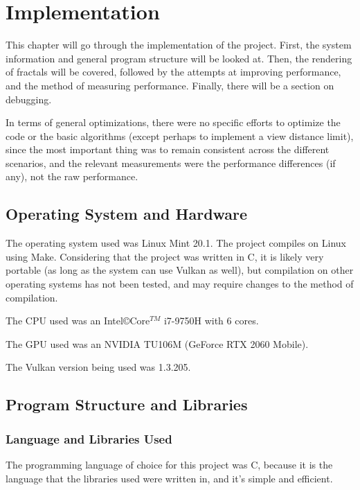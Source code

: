 \chapter{Implementation}
\label{chapter3}

This chapter will go through the implementation of the project. First, the system information and general program structure will be looked at. Then, the rendering of fractals will be covered, followed by the attempts at improving performance, and the method of measuring performance. Finally, there will be a section on debugging.\newline

In terms of general optimizations, there were no specific efforts to optimize the code or the basic algorithms (except perhaps to implement a view distance limit), since the most important thing was to remain consistent across the different scenarios, and the relevant measurements were the performance differences (if any), not the raw performance.

\section{Operating System and Hardware}

The operating system used was Linux Mint 20.1. The project compiles on Linux using Make. Considering that the project was written in C, it is likely very portable (as long as the system can use Vulkan as well), but compilation on other operating systems has not been tested, and may require changes to the method of compilation.\newline

The CPU used was an Intel\copyright Core$^{TM}$ i7-9750H with 6 cores.

The GPU used was an NVIDIA TU106M (GeForce RTX 2060 Mobile).

The Vulkan version being used was 1.3.205.

\section{Program Structure and Libraries}

\subsection{Language and Libraries Used}

The programming language of choice for this project was C, because it is the language that the libraries used were written in, and it's simple and efficient.

